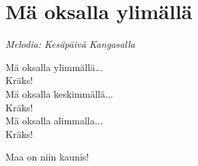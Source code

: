 \section{Mä oksalla ylimällä}
\textit{Melodia: Kesäpäivä Kangasalla}

Mä oksalla ylimmällä...\\
Kräks!\\
Mä oksalla keskimmällä...\\
Kräks!\\
Mä oksalla alimmalla...\\
Kräks!

Maa on niin kaunis!

